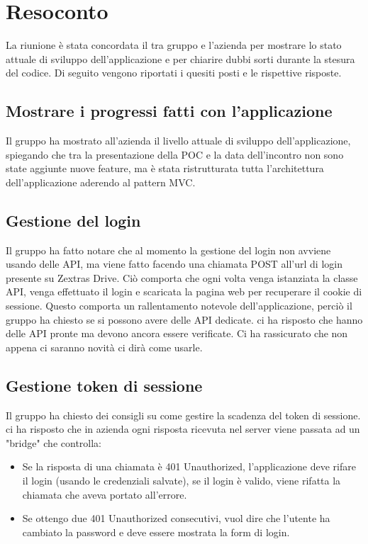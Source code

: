 \section{Resoconto}

La riunione è stata concordata il tra gruppo \textit{\Gruppo{}} e l'azienda per mostrare lo stato attuale di sviluppo dell'applicazione e per chiarire dubbi sorti durante la stesura del codice. Di seguito vengono riportati i quesiti posti e le rispettive risposte. 

\subsection{Mostrare i progressi fatti con l'applicazione}
Il gruppo ha mostrato all'azienda il livello attuale di sviluppo dell'applicazione, spiegando che tra la presentazione della POC e la data dell'incontro non sono state aggiunte nuove feature, 
ma è stata ristrutturata tutta l'architettura dell'applicazione aderendo al pattern MVC.

\subsection{Gestione del login}
Il gruppo ha fatto notare che al momento la gestione del login non avviene usando delle API, ma viene fatto facendo una chiamata POST all'url di login presente su Zextras Drive.
Ciò comporta che ogni volta venga istanziata la classe API, venga effettuato il login e scaricata la pagina web per recuperare il cookie di sessione. Questo comporta un rallentamento notevole dell'applicazione, 
perciò il gruppo ha chiesto se si possono avere delle API dedicate. \Federico{} ci ha risposto che hanno delle API pronte ma devono ancora essere verificate. Ci ha rassicurato che non appena ci saranno novità ci dirà come usarle.

\subsection{Gestione token di sessione}
Il gruppo ha chiesto dei consigli su come gestire la scadenza del token di sessione. \Alessio{} ci ha risposto che in azienda ogni risposta ricevuta nel server viene passata ad un "bridge" che controlla:
\begin{itemize}
    \item Se la risposta di una chiamata è 401 Unauthorized, l'applicazione deve rifare il login (usando le credenziali salvate), se il login è valido, viene rifatta la chiamata che aveva portato all'errore.
    \item Se ottengo due 401 Unauthorized consecutivi, vuol dire che l'utente ha cambiato la password e deve essere mostrata la form di login.
\end{itemize}

